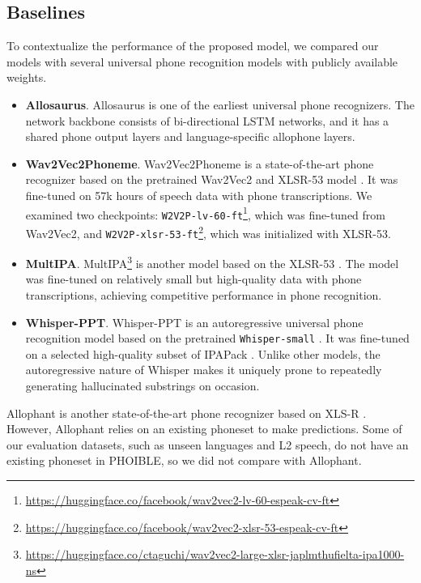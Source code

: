 \documentclass[11pt]{article}
\begin{document}
\subsection{Baselines}
To contextualize the performance of the proposed model, we compared our models with several universal phone recognition models with publicly available weights. 
\begin{itemize}
    \setlength{\parskip}{1pt}  %
    \item \textbf{Allosaurus}. Allosaurus \cite{li2020universal} is one of the earliest universal phone recognizers. The network backbone consists of bi-directional LSTM networks, and it has a shared phone output layers and language-specific allophone layers. 
    \item \textbf{Wav2Vec2Phoneme}. Wav2Vec2Phoneme \cite{xu22b_interspeech} is a state-of-the-art phone recognizer based on the pretrained Wav2Vec2 and XLSR-53 model \cite{baevski2020wav2vec,conneau2020unsupervised}. It was fine-tuned on 57k hours of speech data with phone transcriptions. We examined two checkpoints: \texttt{W2V2P-lv-60-ft}\footnote{\url{https://huggingface.co/facebook/wav2vec2-lv-60-espeak-cv-ft}}, which was fine-tuned from Wav2Vec2, and \texttt{W2V2P-xlsr-53-ft}\footnote{\url{https://huggingface.co/facebook/wav2vec2-xlsr-53-espeak-cv-ft}}, which was initialized with XLSR-53. 
    \item \textbf{MultIPA}. MultIPA\footnote{\url{https://huggingface.co/ctaguchi/wav2vec2-large-xlsr-japlmthufielta-ipa1000-ns}} \cite{taguchi23_interspeech} is another model based on the XLSR-53 \cite{conneau2020unsupervised}. The model was fine-tuned on relatively small but high-quality data with phone transcriptions, achieving competitive performance in phone recognition. 
    \item \textbf{Whisper-PPT}. Whisper-PPT \cite{samir2024efficiently} is an autoregressive universal phone recognition model based on the pretrained \texttt{Whisper-small} \cite{radford2023robust}. It was fine-tuned on a selected high-quality subset of IPAPack \cite{zhu-etal-2024-taste}. Unlike other models, the autoregressive nature of Whisper makes it uniquely prone to repeatedly generating hallucinated substrings on occasion.  
\end{itemize}
Allophant \cite{glocker23_interspeech} is another state-of-the-art phone recognizer based on XLS-R \cite{babu22_interspeech}. However, Allophant relies on an existing phoneset to make predictions. Some of our evaluation datasets, such as unseen languages and L2 speech, do not have an existing phoneset in PHOIBLE, so we did not compare with Allophant. 
\end{document}
